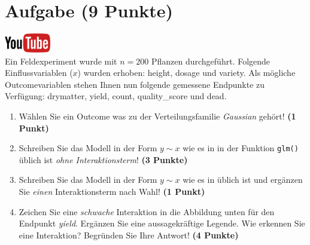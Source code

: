 \documentclass[a4paper, 9pt]{scrartcl}\usepackage[]{graphicx}\usepackage[]{xcolor}
\begin{document}
\section{Aufgabe \hfill (9 Punkte)}

\hfill\href{https://youtu.be/AwQEcQWLFCw}{\includegraphics[width =
  2cm]{img/youtube}}\\[1Ex]



Ein Feldexperiment wurde mit $n = 200$ Pflanzen durchgef{\"u}hrt. Folgende
Einflussvariablen ($x$) wurden erhoben: height, dosage und variety. Als m{\"o}gliche Outcomevariablen stehen Ihnen nun
folgende gemessene Endpunkte zu Verf{\"u}gung: drymatter, yield, count, quality\_score und dead.

\begin{enumerate}
\item W{\"a}hlen Sie ein Outcome was zu der Verteilungsfamilie
  \textit{Gaussian} geh{\"o}rt! \textbf{(1 Punkt)}
\item Schreiben Sie das Modell in der Form $y \sim x$ wie es in \Rlogo in
  der Funktion \texttt{glm()}
  {\"u}blich ist \textit{ohne Interaktionsterm}! \textbf{(3 Punkte)}
\item Schreiben Sie das Modell in der Form $y \sim x$ wie es in \Rlogo
  {\"u}blich ist und erg{\"a}nzen Sie \textit{einen} Interaktionsterm nach Wahl! \textbf{(1 Punkt)} 
\item Zeichen Sie eine \textit{schwache}
  Interaktion in die Abbildung unten f{\"u}r den Endpunkt
  \textit{yield}. Erg{\"a}nzen Sie eine aussagekr{\"a}ftige Legende. Wie erkennen
  Sie eine Interaktion? Begr{\"u}nden Sie Ihre Antwort! \textbf{(4 Punkte)}
\end{enumerate}
\end{document}
